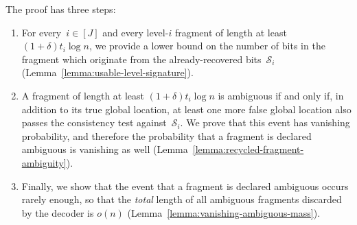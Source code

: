 \documentclass[journal,letterpaper,onecolumn,11pt]{IEEEtran}
\newcommand{\cA}{\mathcal{A}}
\newcommand{\cB}{\mathcal{B}}
\newcommand{\cD}{\mathcal{D}}
\newcommand{\cS}{\mathcal{S}}
\newcommand{\boldu}{\mathbf{u}}
\newcommand{\boldv}{\mathbf{v}}
\newcommand{\boldz}{\mathbf{z}}
\begin{document}
The proof has three steps: 
\begin{enumerate}
    \item For every~$i\in[J]$  and every level-\(i\) fragment of length at least
    \((1+\delta)t_i\log n\), we provide a lower bound on the number of bits in the fragment which originate from the already-recovered bits~$\cS_i$ (Lemma~\ref{lemma:usable-level-signature}).
    \item A fragment of length at least
    \((1+\delta)t_i\log n\) is ambiguous if and only if, in addition to its true global location, at least one more false global location also passes the consistency test against~$\cS_i$.
    We prove that this event has vanishing probability, and therefore the probability that a fragment is declared ambiguous is vanishing as well (Lemma~\ref{lemma:recycled-fragment-ambiguity}).
    \item Finally, we show that the event that a fragment is declared ambiguous occurs rarely enough, so that the \textit{total} length of all ambiguous fragments discarded by the decoder is \(o(n)\) (Lemma~\ref{lemma:vanishing-ambiguous-mass}).
\end{enumerate}

\end{document}
